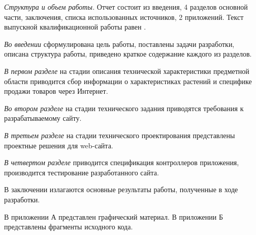 \emph{Структура и объем работы.} Отчет состоит из введения, 4 разделов основной части, заключения, списка использованных источников, 2 приложений. Текст выпускной квалификационной работы равен .

\emph{Во введении} сформулирована цель работы, поставлены задачи разработки, описана структура работы, приведено краткое содержание каждого из разделов.

\emph{В первом разделе} на стадии описания технической характеристики предметной области приводится сбор информации о характеристиках растений и специфике продажи товаров через Интернет.

\emph{Во втором разделе} на стадии технического задания приводятся требования к разрабатываемому сайту.

\emph{В третьем разделе} на стадии технического проектирования представлены проектные решения для web-сайта.

\emph{В четвертом разделе} приводится спецификация контроллеров приложения, производится тестирование разработанного сайта.

В заключении излагаются основные результаты работы, полученные в ходе разработки.

В приложении А представлен графический материал.
В приложении Б представлены фрагменты исходного кода.

